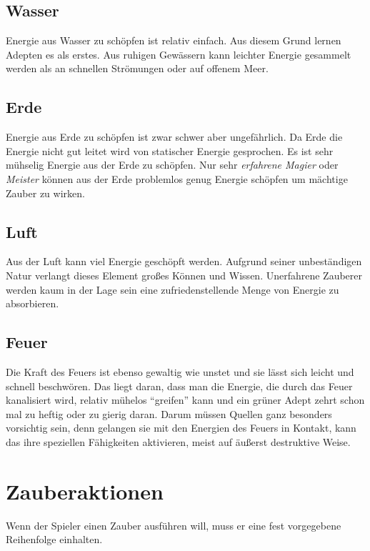 \subsection{Wasser}
Energie aus Wasser zu schöpfen ist relativ einfach. Aus diesem Grund lernen Adepten es als erstes. Aus ruhigen Gewässern kann leichter Energie gesammelt werden als an schnellen Strömungen oder auf offenem Meer.

\subsection{Erde}
Energie aus Erde zu schöpfen ist zwar schwer aber ungefährlich. Da Erde die Energie nicht gut leitet wird von statischer Energie gesprochen. Es ist sehr mühselig Energie aus der Erde zu schöpfen. Nur sehr \textit{erfahrene Magier} oder \textit{Meister} können aus der Erde problemlos genug Energie schöpfen um mächtige Zauber zu wirken.

\subsection{Luft}
Aus der Luft kann viel Energie geschöpft werden. Aufgrund seiner unbeständigen Natur verlangt dieses Element großes Können und Wissen. Unerfahrene Zauberer werden kaum in der Lage sein eine zufriedenstellende Menge von Energie zu absorbieren.

\subsection{Feuer}
Die Kraft des Feuers ist ebenso gewaltig wie unstet und sie lässt sich leicht und schnell beschwören. Das liegt daran, dass man die Energie, die durch das Feuer kanalisiert wird, relativ mühelos "`greifen"' kann und ein grüner Adept zehrt schon mal zu heftig oder zu gierig daran. Darum müssen Quellen ganz besonders vorsichtig sein, denn gelangen sie mit den Energien des Feuers in Kontakt, kann das ihre speziellen Fähigkeiten aktivieren, meist auf äußerst destruktive Weise.


\section{Zauberaktionen}
Wenn der Spieler einen Zauber ausführen will, muss er eine fest vorgegebene Reihenfolge einhalten.


